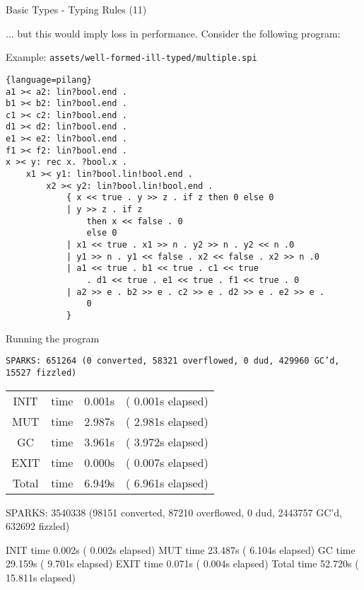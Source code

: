 \begin{frame}[fragile]{Basic Types - Typing Rules (11)}
    
    ... but this would imply loss in performance. Consider the following program:
    \begin{exampleblock}{Example: \texttt{assets/well-formed-ill-typed/multiple.spi}}
\tiny\begin{lstlisting}{language=pilang}
a1 >< a2: lin?bool.end .
b1 >< b2: lin?bool.end .
c1 >< c2: lin?bool.end .
d1 >< d2: lin?bool.end .
e1 >< e2: lin?bool.end .
f1 >< f2: lin?bool.end .
x >< y: rec x. ?bool.x .
    x1 >< y1: lin?bool.lin!bool.end .
        x2 >< y2: lin?bool.lin!bool.end .
            { x << true . y >> z . if z then 0 else 0
            | y >> z . if z
                then x << false . 0
                else 0
            | x1 << true . x1 >> n . y2 >> n . y2 << n .0
            | y1 >> n . y1 << false . x2 << false . x2 >> n .0
            | a1 << true . b1 << true . c1 << true 
                . d1 << true . e1 << true . f1 << true . 0
            | a2 >> e . b2 >> e . c2 >> e . d2 >> e . e2 >> e . 
                0
            }
        \end{lstlisting}
    \end{exampleblock}
\end{frame}

\begin{frame}{}
    Running the program 
    \begin{minipage}{0.45\textwidth}
        \small\texttt{SPARKS: 651264 (0 converted, 58321 overflowed, 0 dud, 429960 GC'd, 15527 fizzled)}
        
        \small\begin{tabular}{cccc}
            INIT    & time &    0.001s &  (  0.001s elapsed) \\
            MUT     & time &    2.987s &  (  2.981s elapsed) \\
            GC      & time &    3.961s &  (  3.972s elapsed) \\
            EXIT    & time &    0.000s &  (  0.007s elapsed) \\
            Total   & time &    6.949s &  (  6.961s elapsed)
        \end{tabular}
        
      
    \end{minipage}
    \begin{minipage}{0.45\textwidth}
        SPARKS: 3540338 (98151 converted, 87210 overflowed, 0 dud, 2443757 GC'd, 632692 fizzled)
      
        INIT    time    0.002s  (  0.002s elapsed)
        MUT     time   23.487s  (  6.104s elapsed)
        GC      time   29.159s  (  9.701s elapsed)
        EXIT    time    0.071s  (  0.004s elapsed)
        Total   time   52.720s  ( 15.811s elapsed)
      
    \end{minipage}

\end{frame}